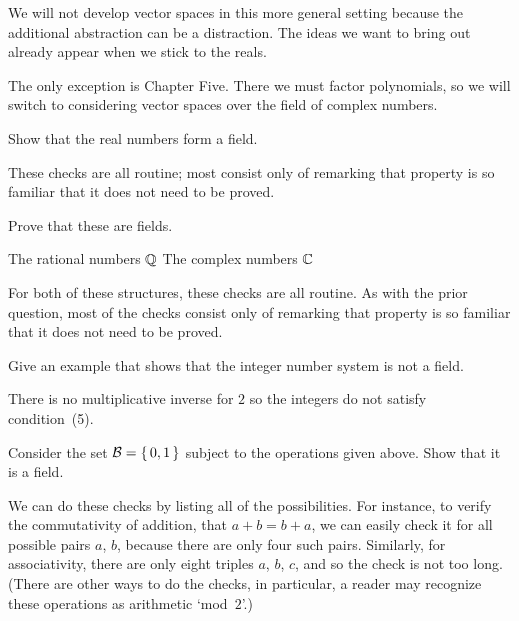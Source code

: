 We will not develop vector spaces in this more general setting because
the additional abstraction can be a distraction.
The ideas we want to bring out already appear when we stick to the reals.

The only exception is Chapter Five.
There we must factor polynomials,
so we will switch to considering vector spaces over the
field of complex numbers.

\begin{exercises}
  \item 
    Show that the real numbers form a field.
    \begin{answer}
      These checks are all routine; most consist only of remarking that 
      property is so familiar that it does not need to be proved.
    \end{answer}
  \item 
    Prove that these are fields.
    \begin{exparts*}
       \partsitem The rational numbers $\mathbb{Q}$
       \partsitem The complex numbers  $\mathbb{C}$
    \end{exparts*}
    \begin{answer}
      For both of these structures, these checks are all routine.
      As with the prior question, most of the checks consist only of remarking
      that property is so familiar that it does not need to be proved.
    \end{answer}
  \item 
     Give an example that shows that the integer number system
     is not a field.
     \begin{answer}
       There is no multiplicative inverse for $2$ so the integers do not
       satisfy condition~(5).
     \end{answer}
  \item \label{exer:BinField} 
     Consider the set $\mathcal{B}=\mbox{$\{\,0,1\,\}$}$ subject to the operations 
     given above.
     Show that it is a field.
     \begin{answer}
       We can do these checks by listing all of the possibilities.
       For instance, to verify the commutativity of addition, that $a+b=b+a$,
       we can easily check it for all possible pairs $a$, $b$, because there
       are only four such pairs.  
       Similarly, for associativity, there are only eight triples $a$, $b$,
       $c$, and so the check is not too long.
       (There are other ways to do the checks, in particular, a reader may 
       recognize these operations as arithmetic `mod~$2$'.)
     \end{answer}

\end{exercises}
